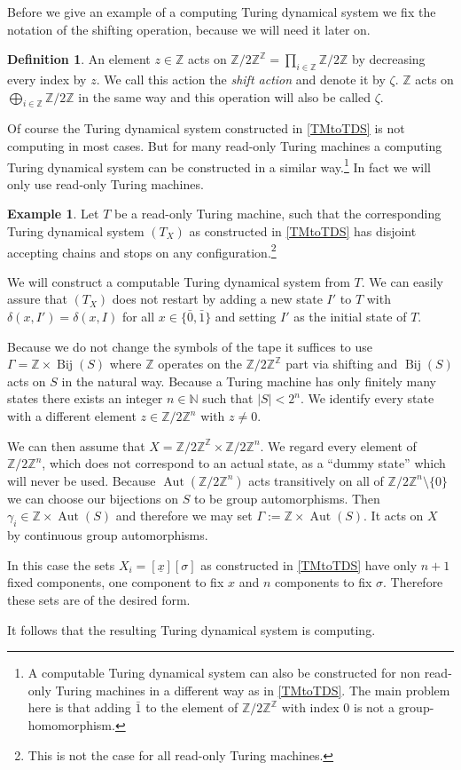 \documentclass[12pt,a4paper]{scrartcl}
\theoremstyle{plain}
\theoremstyle{definition}
\newtheorem{Definition}[Theorem]{Definition}
\newtheorem{Example}[Theorem]{Example}
\newcommand{\Z}{\mathbb{Z}} %
\newcommand{\N}{\mathbb{N}} %
\newcommand{\2}{\mathbb{Z} / 2 \mathbb{Z}}
\newcommand{\1}{\bar{1}}
\newcommand{\0}{\bar{0}}
\newcommand{\Aut}{\operatorname{Aut}}
\newcommand{\Bij}{\operatorname{Bij}}
\begin{document}
Before we give an example of a computing Turing dynamical system we fix the notation of the shifting operation, because we will need it later on.
\begin{Definition} \label{shift}
	An element $z \in \Z$ acts on $\2^{\Z} = \prod_{i \in \Z} \2$ by decreasing every index by $z$. We call this action the \emph{shift action} and denote it by $\zeta$. $\Z$ acts on $\bigoplus_{i \in \Z} \2$ in the same way and this operation will also be called $\zeta$.
\end{Definition}
Of course the Turing dynamical system constructed in \ref{TMtoTDS} is not computing in most cases. But for many read-only Turing machines a computing Turing dynamical system can be constructed in a similar way.\footnote{A computable Turing dynamical system can also be constructed for non read-only Turing machines in a different way as in \ref{TMtoTDS}. The main problem here is that adding $\1$ to the element of $\2^\Z$ with index $0$ is not a group-homomorphism.} In fact we will only use read-only Turing machines.
\begin{Example} \label{roTMtoTDS}
	Let $T$ be a read-only Turing machine, such that the corresponding Turing dynamical system $(T_X)$ as constructed in \ref{TMtoTDS} has disjoint accepting chains and stops on any configuration.\footnote{This is not the case for all read-only Turing machines.}
	
	We will construct a computable Turing dynamical system from $T$.  We can easily assure that $(T_X)$ does not restart by adding a new state $I'$ to $T$ with $\delta(x, I') = \delta(x, I)$ for all $x \in \{ \0, \1 \}$ and setting $I'$ as the initial state of $T$.
	
	Because we do not change the symbols of the tape it suffices to use $\Gamma = \Z \times \Bij(S)$ where $\Z$ operates on the $\2^\Z$ part via shifting and $\Bij(S)$ acts on $S$ in the natural way. Because a Turing machine has only finitely many states there exists an integer $n \in \N$ such that $|S| < 2^n$. We identify every state with a different element $z \in \2^n$ with $z \neq 0$.
	
	We can then assume that $X = \2^\Z \times \2^n$. We regard every element of $\2^n$, which does not correspond to an actual state, as a ``dummy state'' which will never be used. Because $\Aut(\2^n)$ acts transitively on all of $\2^n \setminus \{0\}$ we can choose our bijections on $S$ to be group automorphisms. Then $\gamma_i \in \Z \times \Aut(S)$ and therefore we may set $\Gamma := \Z \times \Aut(S)$. It acts on $X$ by continuous group automorphisms.
	
	In this case the sets $X_i = [\underline{x}][\sigma]$ as constructed in \ref{TMtoTDS} have only $n+1$ fixed components, one component to fix $x$ and $n$ components to fix $\sigma$. Therefore these sets are of the desired form.
	 
	It follows that the resulting Turing dynamical system is computing.
\end{Example}
\end{document}
